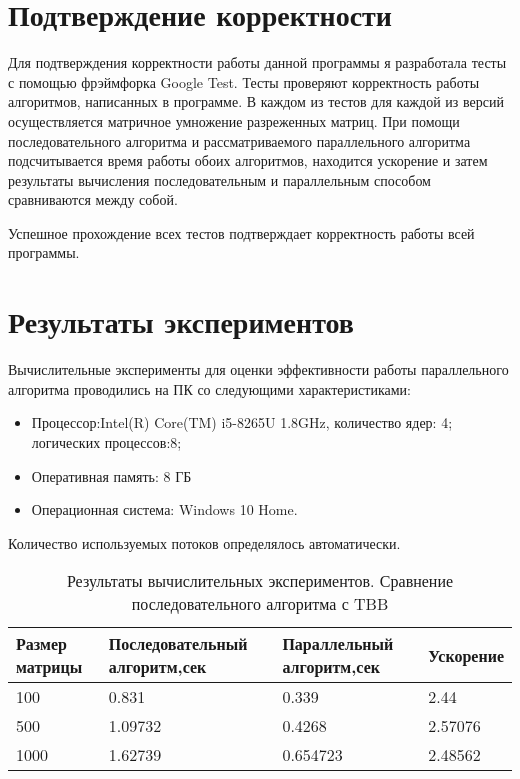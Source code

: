 \documentclass{report}
\begin{document}
\section*{Подтверждение корректности}
Для подтверждения корректности работы данной программы я разработала тесты с помощью фрэймфорка Google Test. Тесты проверяют корректность работы алгоритмов, написанных в программе. В каждом из тестов для каждой из версий осуществляется матричное умножение разреженных матриц. При помощи последовательного алгоритма и рассматриваемого параллельного алгоритма подсчитывается время работы обоих алгоритмов, находится ускорение и затем результаты вычисления  последовательным и параллельным способом сравниваются между собой.
\par Успешное прохождение всех тестов подтверждает корректность работы всей программы.
\newpage

\section*{Результаты экспериментов}
Вычислительные эксперименты для оценки эффективности работы параллельного алгоритма проводились на ПК со следующими характеристиками:
\begin{itemize}
\item Процессор:Intel(R) Core(TM) i5-8265U 1.8GHz, количество ядер: 4; логических процессов:8;
\item Оперативная память: 8 ГБ
\item Операционная система: Windows 10 Home.
\end{itemize}
\par Количество используемых потоков определялось автоматически.
\begin{table}[!h]
\caption{Результаты вычислительных экспериментов. Сравнение последовательного алгоритма с TBB}
\centering
\begin{tabular}{|p{4cm}|p{4cm}|p{4cm}|p{3cm}|}
\hline
Размер матрицы & Последовательный алгоритм,сек & Параллельный алгоритм,сек & Ускорение  \\\hline
100 & 0.831 & 0.339 & 2.44  \\\hline
500  & 1.09732 & 0.4268 & 2.57076  \\\hline
1000 & 1.62739 & 0.654723 & 2.48562  \\
\hline
\end{tabular}
\end{table}
\end{document}
